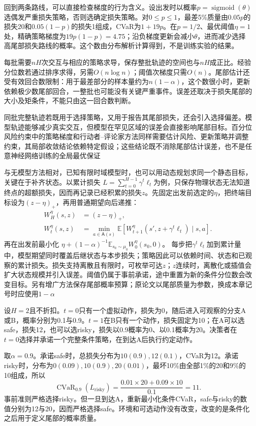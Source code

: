 回到两条路线，可以直接检查梯度的行为含义。设出发时以概率$p=\operatorname{sigmoid}(\theta)$选偶发严重损失策略，否则选确定损失策略。对$0\leq p\leq1$，最差5\%质量由$0.05p$的损失20和$0.05(1-p)$的损失1组成，CVaR为$1+19p$。在$p=1/2$、最优阈值$\eta=1$处，精确策略梯度为$19p(1-p)=4.75$；沿负梯度更新会减小$\theta$，进而减少选择高尾部损失路线的概率。这个数由分布解析计算得到，不是训练实验的结果。

每批需要$nH$次交互与相应的策略求导，保存整批轨迹的空间也与$nH$成正比。经验分位数若通过排序求得，另需$O(n\log n)$；阈值次梯度只需$O(n)$。尾部估计还受有效回合数限制：用于最差部分的样本量约为$n(1-\alpha)$，这个数很小时，更新依赖极少数尾部回合，一整批也可能没有关键严重事件。误差还取决于损失尾部的大小及矩条件，不能只由这一回合数判断。

同批完整轨迹若既用于选择策略，又用于报告其尾部损失，还会引入选择偏差。模型轨迹能够减少真实交互，但模型在罕见区域的误差会直接影响尾部目标。百分位风险约束中的策略梯度和行动者--评论家方法同样需要估计风险、更新策略并调整约束，其局部收敛结论依赖特定假设；这些结论既不消除尾部估计误差，也不是任意神经网络训练的全局最优保证

与无模型方法相对，已知有限时域模型时，也可以用动态规划求同一个静态目标，关键在于补齐状态。以累计损失
$L=\sum_{t=0}^{H-1}\gamma^t\ell_t$为例，只保存物理状态无法知道终点的超额损失，因而再记录已经积累的损失$z$。先固定出发前选定的$\eta$，把终端目标设为$(z-\eta)_+$，再用普通期望向后递推：
\begin{align}
  W_H^\eta(s,z)&=(z-\eta)_+, \nonumber\\
  W_t^\eta(s,z)&=\min_{a\in\mathsf A(s)}
       \mathbb E\!\left[
       W_{t+1}^\eta(s',z+\gamma^t\ell_t)\mid s,a\right].
  \label{eq:rl-trustworthy-augmented-risk}
\end{align}
再在出发前最小化
$\eta+(1-\alpha)^{-1}\mathbb E_{s_0\sim\mu_0}W_0^\eta(s_0,0)$。
每步把$\gamma^t\ell_t$加到累计量中，模型期望同时覆盖后继状态与本步损失；策略因此可以依赖时间、状态和已观察的累计损失。损失支持离散且有限时，可枚举可达$z$；$z$连续时，离散化或插值会扩大状态规模并引入误差。阈值仍属于事前承诺，途中重置为新的条件分位数会改变目标。另有增广方法保存尾部概率预算；原论文以尾部质量为参数，换成本章记号时应使用$1-\alpha$

\begin{example}[静态CVaR的时间不一致]
  \label{ex:rl-trustworthy-time-inconsistency}
  设$H=2$且不折扣。$t=0$只有一个虚拟动作，损失为0，随后进入可观察的分支A或B，概率分别为0.1与0.9。$t=1$在B只有一个动作，损失固定为10；在A可以选safe，损失12，也可以选risky，损失以0.9概率为0、以0.1概率为20。决策者在$t=0$选择并承诺一个完整条件策略，在到达A后执行约定动作。

  取$\alpha=0.9$。承诺safe时，总损失分布为$10(0.9),12(0.1)$，CVaR为12。承诺risky时，分布为$0(0.09),10(0.9),20(0.01)$，最坏10\%由全部1\%的20和9\%的10组成，所以
  \[
    \operatorname{CVaR}_{0.9}(L_{\text{risky}})
       =\frac{0.01\times20+0.09\times10}{0.1}=11.
  \]
  事前准则严格选择risky。但一旦到达A，重新最小化条件CVaR，safe与risky的数值分别为12与20，因而严格选择safe。环境和可选动作没有改变，改变的是条件化之后用于定义尾部的概率质量。
\end{example}


